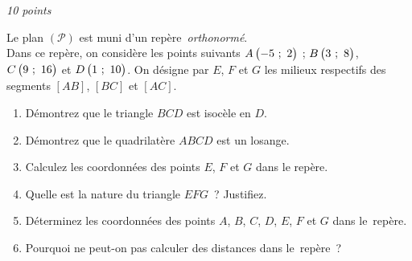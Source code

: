\vspace*{1em}

\begin{minipage}{0.45\textwidth}
\thispagestyle{sujet1}

\vspace*{1em}

%


\exercice\hfill \emph{10 points}

Le plan $\left(\mathscr{P}\right)$ est muni d'un repère~\emph{orthonormé}.\\ Dans ce repère, on considère les points suivants $A\begin{pmatrix}-5~;~2\end{pmatrix}$ ; $B\begin{pmatrix}3~;~8\end{pmatrix}$, $C\begin{pmatrix}9~;~16\end{pmatrix}$ et $D\begin{pmatrix}1~;~10\end{pmatrix}$.
On désigne par $E$, $F$ et $G$ les milieux respectifs des segments $\left[AB\right]$,  $\left[BC\right]$ et $\left[AC\right]$.

\begin{enumerate}
	\item Démontrez que le triangle $BCD$ est isocèle en $D$.
	\item Démontrez que le quadrilatère $ABCD$ est un losange.
	\item Calculez les coordonnées des points $E$, $F$ et $G$ dans le repère.
	\item Quelle est la nature du triangle $EFG$~? Justifiez.
	\item Déterminez les coordonnées des points $A$, $B$, $C$, $D$, $E$, $F$ et $G$ dans le~repère.
	\item Pourquoi ne peut-on pas calculer des distances dans le~repère~?
\end{enumerate}


\end{minipage}
